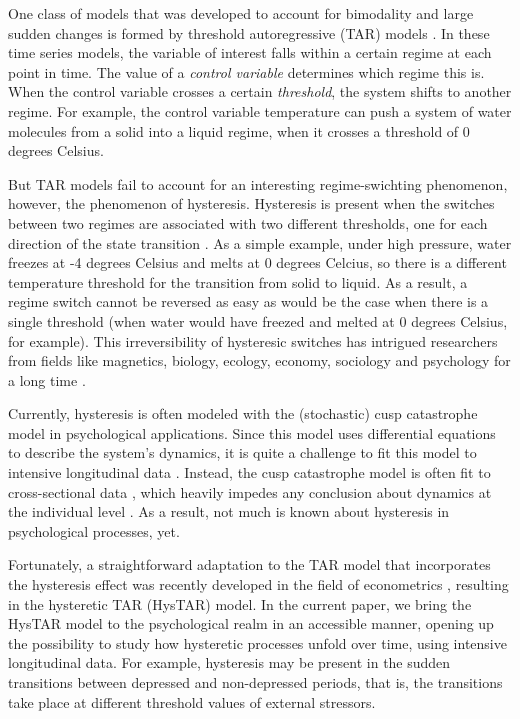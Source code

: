 \documentclass{article}
\begin{document}
One class of models that was developed to account for bimodality and large sudden changes is formed by threshold autoregressive (TAR) models \citep{tar}.
In these time series models, the variable of interest falls within a certain regime at each point in time. 
The value of a \textit{control variable} determines which regime this is. 
When the control variable crosses a certain \textit{threshold}, the system shifts to another regime.
For example, the control variable temperature can push a system of water molecules from a solid into a liquid regime, when it crosses a threshold of 0 degrees Celsius.

But TAR models fail to account for an interesting regime-swichting phenomenon, however, the phenomenon of hysteresis. 
Hysteresis is present when the switches between two regimes are associated with two different thresholds, one for each direction of the state transition \citep{gilmore, strogatz}.
As a simple example, under high pressure, water freezes at -4 degrees Celsius and melts at 0 degrees Celcius, so there is a different temperature threshold for the transition from solid to liquid. As a result, a regime switch cannot be reversed as easy as would be the case when there is a single threshold (when water would have freezed and melted at 0 degrees Celsius, for example).
This irreversibility of hysteresic switches has intrigued researchers from fields like magnetics, biology, ecology, economy, sociology and psychology for a long time \citep{hysteresis_mathematical}.

Currently, hysteresis is often modeled with the (stochastic) cusp catastrophe model in psychological applications. Since this model uses differential equations to describe the system's dynamics, it is quite a challenge to fit this model to intensive longitudinal data \citep{cobb, CT_limitations1, CT_limitations2, R_cusp}. 
Instead, the cusp catastrophe model is often fit to cross-sectional data \citep[e.g.,][]{cusp_example_1, cusp_example_2, cusp_example_3}, which heavily impedes any conclusion about dynamics at the individual level \citep{molenaar_manifesto, hamaker_within}.
As a result, not much is known about hysteresis in psychological processes, yet.

Fortunately, a straightforward adaptation to the TAR model that incorporates the hysteresis effect was recently developed in the field of econometrics \citep{bar2}, resulting in the hysteretic TAR (HysTAR) model.
In the current paper, we bring the HysTAR model to the psychological realm in an accessible manner, opening up the possibility to study how hysteretic processes unfold over time, using intensive longitudinal data.
For example, hysteresis may be present in the sudden transitions between depressed and non-depressed periods, that is, the transitions take place at different threshold values of external stressors.
\end{document}
